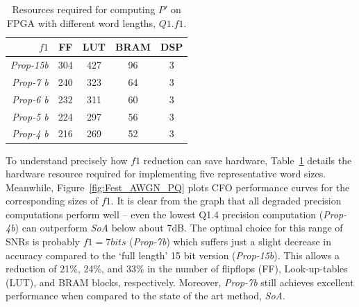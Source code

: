 \begin{table}[hb]
	\centering
	\caption{Resources required for computing $P'$ on FPGA with different word lengths, $Q1.f1$.}
	\label{tab:P-Metric}
	\begin{tabular}{r|c|c|c|c}
        \hline \hline
    			 {$f1$}	&  {FF}	&  {LUT}  &  {BRAM} &  {DSP}\\
	\hline
		\textit{Prop-15b}	& 304 	& 427 	& 96	& 3 \\
		\textit{Prop-7 b}		& 240 	& 323	& 64 	& 3 \\
		\textit{Prop-6 b}		& 232 	& 311	& 60 	& 3 \\
		\textit{Prop-5 b}		& 224  	& 297  	& 56	& 3 \\
		\textit{Prop-4 b}		& 216  	& 269  	& 52	& 3 \\
	\hline \hline
    \end{tabular}
\end{table}

To understand precisely how $f1$ reduction can save hardware, Table~\ref{tab:P-Metric} details the hardware resource required for implementing five representative word sizes. Meanwhile, Figure~\ref{fig:Fest_AWGN_PQ} plots CFO performance curves for the corresponding sizes of $f1$. It is clear from the graph that all degraded precision computations perform well -- even the lowest Q1.4 precision computation (\textit{Prop-4b}) can outperform \textit{SoA} below about 7dB.
The optimal choice for this range of SNRs is probably $f1=7bits$ (\textit{Prop-7b}) which suffers just a slight decrease in accuracy compared to the `full length' 15 bit version (\textit{Prop-15b}). This allows a reduction of 21\%, 24\%, and 33\% in the number of flipflops (FF), Look-up-tables (LUT), and BRAM blocks, respectively. Moreover, \textit{Prop-7b} still achieves excellent performance when compared to the state of the art method, \textit{SoA}.

